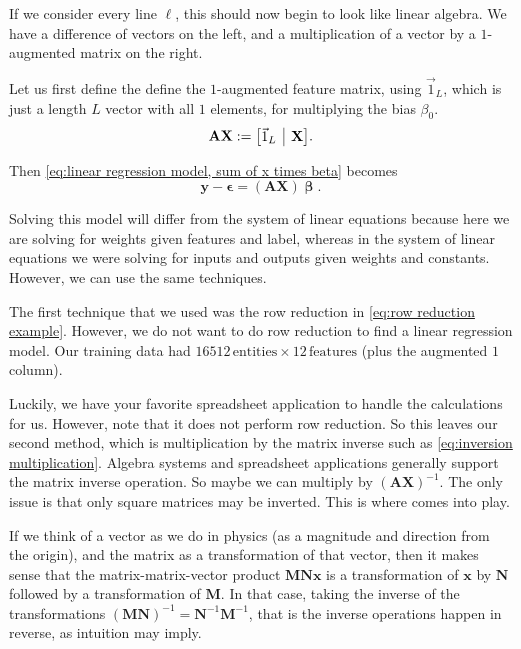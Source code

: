 \documentclass{article}
\begin{document}
If we consider every line $\ell$, this should now
begin to look like linear algebra. We have a difference of vectors on the left, and a multiplication of a vector by a $1$-augmented matrix on the right.

Let us first define the define the $1$-augmented feature matrix, using 
$\vec{1}_L$, which is just a length $L$ vector with all $1$ elements,
for multiplying the bias $\beta_0$.
\begin{equation}
    \mathbf{AX} := \left[
        \begin{array}{@{}c|c@{}}
            \vec{1}_L & \mathbf{X}
        \end{array}
    \right]\!.
\end{equation}

Then \eqref{eq:linear regression model, sum of x times beta} becomes
\begin{equation}
    \mathbf{y} - \boldsymbol\epsilon = \left(\mathbf{AX}\right)\!\boldsymbol\upbeta.
\end{equation}

Solving this model will differ from the system of linear equations because here we are solving for weights given features and label, whereas in the system of linear equations we were solving for inputs and outputs given weights and constants.
However, we can use the same techniques.

The first technique that we used was the row reduction in \eqref{eq:row reduction example}. However, we do not want to do row reduction to find a linear regression model. Our training data had $\num{16 512}\,\text{entities}\times12\,\text{features}$ (plus the augmented $1$ column).

Luckily, we have your favorite spreadsheet application to handle the calculations for us. However, note that it does not perform row reduction. So this leaves our second method, which is multiplication by the matrix inverse such as \eqref{eq:inversion multiplication}. Algebra systems and spreadsheet applications generally support the matrix inverse operation. So maybe we can multiply by $(\mathbf{AX})^{-1}$.
The only issue is that only square matrices may be inverted. This is where  comes into play.

If we think of a vector as we do in physics (as a magnitude and direction from the origin), and the matrix as a transformation of that vector, then it makes sense that the matrix-matrix-vector product $\mathbf{M}\mathbf{N}\mathbf{x}$ is a transformation of $\mathbf{x}$ by $\mathbf{N}$ followed by a transformation of $\mathbf{M}$. In that case, taking the inverse of the transformations $(\mathbf{M}\mathbf{N})^{-1} = \mathbf{N}^{-1}\mathbf{M}^{-1}$, that is the inverse operations happen in reverse, as intuition may imply.
\end{document}

